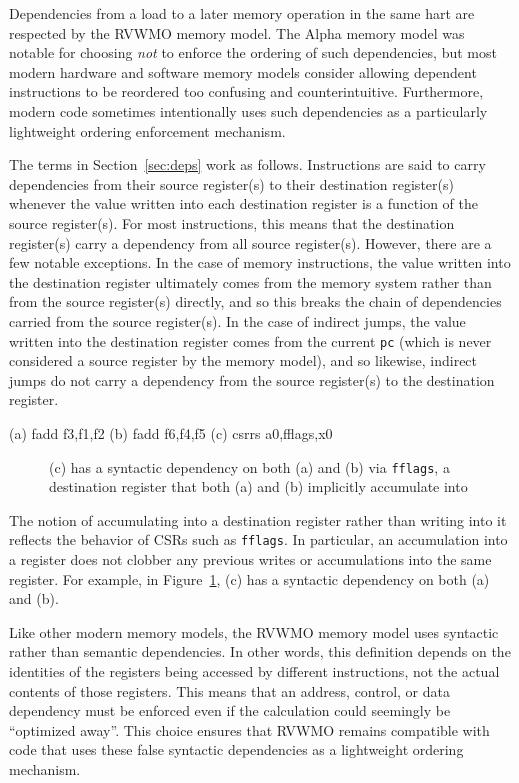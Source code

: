 Dependencies from a load to a later memory operation in the same hart are respected by the RVWMO memory model.
The Alpha memory model was notable for choosing {\em not} to enforce the ordering of such dependencies, but most modern hardware and software memory models consider allowing dependent instructions to be reordered too confusing and counterintuitive.
Furthermore, modern code sometimes intentionally uses such dependencies as a particularly lightweight ordering enforcement mechanism.

The terms in Section~\ref{sec:deps} work as follows.
Instructions are said to carry dependencies from their source register(s) to their destination register(s) whenever the value written into each destination register is a function of the source register(s).
For most instructions, this means that the destination register(s) carry a dependency from all source register(s).
However, there are a few notable exceptions.
In the case of memory instructions, the value written into the destination register ultimately comes from the memory system rather than from the source register(s) directly, and so this breaks the chain of dependencies carried from the source register(s).
In the case of indirect jumps, the value written into the destination register comes from the current {\tt pc} (which is never considered a source register by the memory model), and so likewise, indirect jumps do not carry a dependency from the source register(s) to the destination register.

\begin{verbbox}
(a) fadd  f3,f1,f2
(b) fadd  f6,f4,f5
(c) csrrs a0,fflags,x0
\end{verbbox}
\begin{figure}[h!]
  \centering\small
  \theverbbox
  \caption{(c) has a syntactic dependency on both (a) and (b) via {\tt fflags}, a destination register that both (a) and (b) implicitly accumulate into}
  \label{fig:litmus:fflags}
\end{figure}

The notion of accumulating into a destination register rather than writing into it reflects the behavior of CSRs such as {\tt fflags}.
In particular, an accumulation into a register does not clobber any previous writes or accumulations into the same register.
For example, in Figure~\ref{fig:litmus:fflags}, (c) has a syntactic dependency on both (a) and (b).

Like other modern memory models, the RVWMO memory model uses syntactic rather than semantic dependencies.
In other words, this definition depends on the identities of the
registers being accessed by different instructions, not the actual
contents of those registers.  This means that an address, control, or
data dependency must be enforced even if the calculation could seemingly
be ``optimized away''.
This choice ensures that RVWMO remains compatible with code that uses these false syntactic dependencies as a lightweight ordering mechanism.

